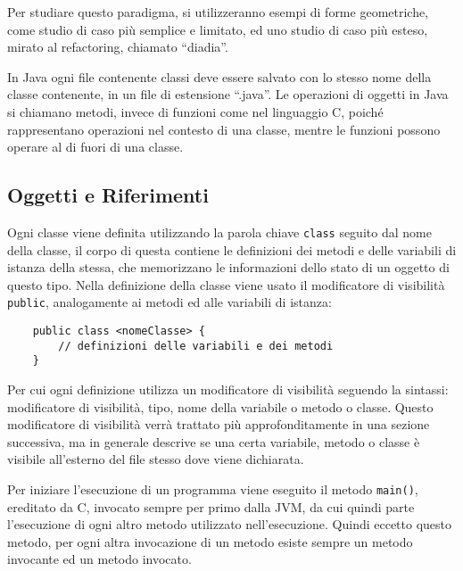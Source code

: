 \documentclass{article}
\numberwithin{equation}{subsection}
\begin{document}
Per studiare questo paradigma, si utilizzeranno esempi di forme geometriche, come studio di caso più semplice e limitato, ed uno studio di caso più esteso, mirato al 
refactoring, chiamato ``diadia''. 


In Java ogni file contenente classi deve essere salvato con lo stesso nome della classe contenente, in un file di estensione ``.java''. Le operazioni di oggetti in Java si chiamano 
metodi, invece di funzioni come nel linguaggio C, poiché rappresentano operazioni nel contesto di una classe, mentre le funzioni possono operare al di fuori di una classe. 

\subsection{Oggetti e Riferimenti}

Ogni classe viene definita utilizzando la parola chiave \verb|class| seguito dal nome della classe, il corpo di questa contiene le definizioni dei metodi e delle variabili di istanza 
della stessa, che memorizzano le informazioni dello stato di un oggetto di questo tipo. Nella definizione della classe viene usato il modificatore di visibilità \verb|public|, analogamente 
ai metodi ed alle variabili di istanza:
\begin{verbatim}
    public class <nomeClasse> {
        // definizioni delle variabili e dei metodi
    }
\end{verbatim} 
Per cui ogni definizione utilizza un modificatore di visibilità seguendo la sintassi: modificatore di visibilità, tipo, nome della variabile o metodo o classe. Questo 
modificatore di visibilità verrà trattato più approfonditamente in una sezione successiva, ma in generale descrive se una certa variabile, metodo o classe è visibile 
all'esterno del file stesso dove viene dichiarata. 

Per iniziare l'esecuzione di un programma viene eseguito il metodo \verb|main()|, ereditato da C, invocato sempre per primo dalla JVM, da cui quindi parte l'esecuzione di ogni altro metodo 
utilizzato nell'esecuzione. Quindi eccetto questo metodo, per ogni altra invocazione di un metodo esiste sempre un metodo invocante ed un metodo invocato. 
\end{document}
